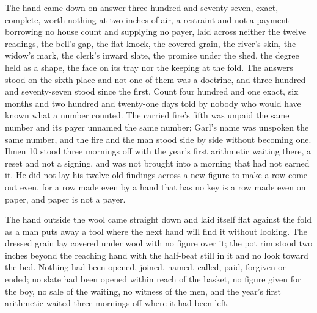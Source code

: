The hand came down on answer three hundred and seventy-seven, exact, complete, worth nothing at two inches of air, a restraint and not a payment borrowing no house count and supplying no payer, laid across neither the twelve readings, the bell's gap, the flat knock, the covered grain, the river's skin, the widow's mark, the clerk's inward slate, the promise under the shed, the degree held as a shape, the face on its tray nor the keeping at the fold. The answers stood on the sixth place and not one of them was a doctrine, and three hundred and seventy-seven stood since the first. Count four hundred and one exact, six months and two hundred and twenty-one days told by nobody who would have known what a number counted. The carried fire's fifth was unpaid the same number and its payer unnamed the same number; Garl's name was unspoken the same number, and the fire and the man stood side by side without becoming one. Ilmen 10 stood three mornings off with the year's first arithmetic waiting there, a reset and not a signing, and was not brought into a morning that had not earned it. He did not lay his twelve old findings across a new figure to make a row come out even, for a row made even by a hand that has no key is a row made even on paper, and paper is not a payer.

The hand outside the wool came straight down and laid itself flat against the fold as a man puts away a tool where the next hand will find it without looking. The dressed grain lay covered under wool with no figure over it; the pot rim stood two inches beyond the reaching hand with the half-beat still in it and no look toward the bed. Nothing had been opened, joined, named, called, paid, forgiven or ended; no slate had been opened within reach of the basket, no figure given for the boy, no sale of the waiting, no witness of the men, and the year's first arithmetic waited three mornings off where it had been left.
